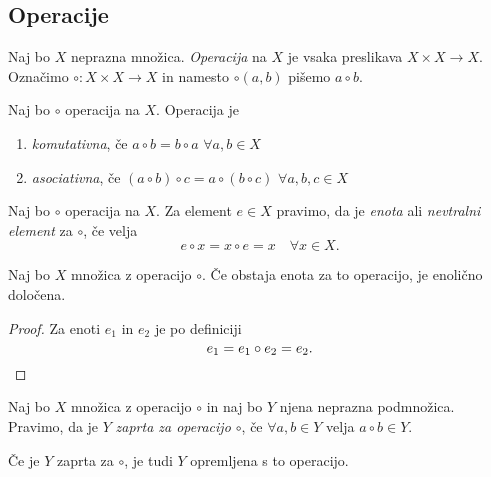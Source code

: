 \documentclass[12pt, a4paper]{article}
\begin{document}
\newpage

\subsection{Operacije}

\begin{okvir}
\begin{definicija}
Naj bo $X$ neprazna množica. \emph{Operacija} na $X$ je vsaka preslikava $X\times X\to X$. Označimo $\circ\colon X\times X\to X$ in namesto $\circ(a,b)$ pišemo $a\circ b$.
\end{definicija}
\end{okvir}

\begin{definicija}
Naj bo $\circ$ operacija na $X$. Operacija je

\begin{enumerate}[label=\roman*)]
\item \emph{komutativna}, če $a\circ b=b\circ a$ $\forall a,b\in X$
\item \emph{asociativna}, če $(a\circ b)\circ c=a\circ(b\circ c)$ $\forall a,b,c\in X$
\end{enumerate}
\end{definicija}

\begin{definicija}
Naj bo $\circ$ operacija na $X$. Za element $e\in X$ pravimo, da je \emph{enota} ali \emph{nevtralni element} za $\circ$, če velja \[
e\circ x=x\circ e=x\quad\forall x\in X.
\]
\end{definicija}

\begin{trditev}
Naj bo $X$ množica z operacijo $\circ$. Če obstaja enota za to operacijo, je enolično določena.
\end{trditev}

\begin{proof}
Za enoti $e_1$ in $e_2$ je po definiciji
\[
e_1=e_1\circ e_2=e_2.\qedhere
\]
\end{proof}

\begin{definicija}
Naj bo $X$ množica z operacijo $\circ$ in naj bo $Y$ njena neprazna podmnožica. Pravimo, da je $Y$ \emph{zaprta za operacijo $\circ$}, če $\forall a,b\in Y$ velja $a\circ b\in Y$.
\end{definicija}
\begin{opomba}
Če je $Y$ zaprta za $\circ$, je tudi $Y$ opremljena s to operacijo.
\end{opomba}
\end{document}
